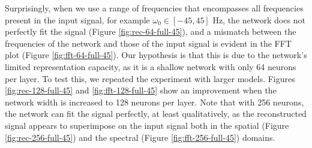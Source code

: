 Surprisingly, when we use a range of frequencies that encompasses all frequencies present in the input signal, for example $\omega_0 \in [-45, 45]$ Hz, the network does not perfectly fit the signal (Figure \ref{fig:rec-64-full-45}), and a mismatch between the frequencies of the network and those of the input signal is evident in the FFT plot (Figure \ref{fig:fft-64-full-45}). Our hypothesis is that this is due to the network's limited representation capacity, as it is a shallow network with only 64 neurons per layer. To test this, we repeated the experiment with larger models. Figures \ref{fig:rec-128-full-45} and \ref{fig:fft-128-full-45} show an improvement when the network width is increased to 128 neurons per layer. Note that with 256 neurons, the network can fit the signal perfectly, at least qualitatively, as the reconstructed signal appears to superimpose on the input signal both in the spatial (Figure \ref{fig:rec-256-full-45}) and the spectral (Figure \ref{fig:fft-256-full-45}) domains.

